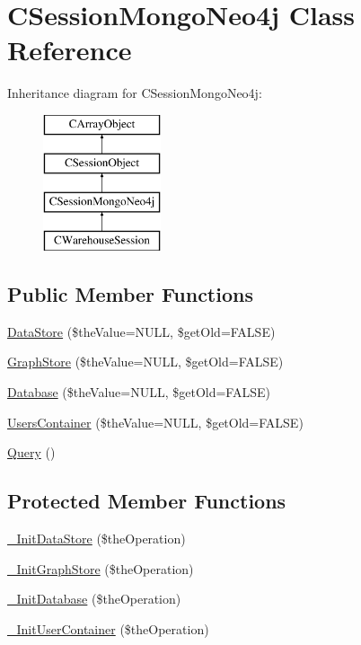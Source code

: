 \hypertarget{class_c_session_mongo_neo4j}{\section{C\-Session\-Mongo\-Neo4j Class Reference}
\label{class_c_session_mongo_neo4j}
}
Inheritance diagram for C\-Session\-Mongo\-Neo4j\-:\begin{figure}[H]
\begin{center}
\leavevmode
\includegraphics[height=4.000000cm]{class_c_session_mongo_neo4j}
\end{center}
\end{figure}
\subsection*{Public Member Functions}
\begin{DoxyCompactItemize}
\item 
\hyperlink{class_c_session_mongo_neo4j_af286bc524ded3db59800bb5e585b0a58}{Data\-Store} (\$the\-Value=N\-U\-L\-L, \$get\-Old=F\-A\-L\-S\-E)
\item 
\hyperlink{class_c_session_mongo_neo4j_aa5e06288fa3a285675da6ba8a2b281d5}{Graph\-Store} (\$the\-Value=N\-U\-L\-L, \$get\-Old=F\-A\-L\-S\-E)
\item 
\hyperlink{class_c_session_mongo_neo4j_ada4d97ca5fb8a3f205517032856a6c1a}{Database} (\$the\-Value=N\-U\-L\-L, \$get\-Old=F\-A\-L\-S\-E)
\item 
\hyperlink{class_c_session_mongo_neo4j_a705c05fae227d70ca244d018b15a6bd4}{Users\-Container} (\$the\-Value=N\-U\-L\-L, \$get\-Old=F\-A\-L\-S\-E)
\item 
\hyperlink{class_c_session_mongo_neo4j_a1362c95656d103b12a04a16bb3b43061}{Query} ()
\end{DoxyCompactItemize}
\subsection*{Protected Member Functions}
\begin{DoxyCompactItemize}
\item 
\hyperlink{class_c_session_mongo_neo4j_a16fcb72ddf0d7e10f1480e9c5206dc5a}{\-\_\-\-Init\-Data\-Store} (\$the\-Operation)
\item 
\hyperlink{class_c_session_mongo_neo4j_ab512e36184ee03fe2fee7a30175f899d}{\-\_\-\-Init\-Graph\-Store} (\$the\-Operation)
\item 
\hyperlink{class_c_session_mongo_neo4j_af755b245fd52b177bc9d8471acc32d8b}{\-\_\-\-Init\-Database} (\$the\-Operation)
\item 
\hyperlink{class_c_session_mongo_neo4j_abf876f3b2e90ed9fab09314b2ebce978}{\-\_\-\-Init\-User\-Container} (\$the\-Operation)
\end{DoxyCompactItemize}
